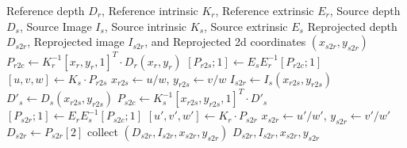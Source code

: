 \begin{algorithm}[!t]
    \caption{Multi-View Reprojection with Depth}
    \label{alg:reproj}
    \begin{algorithmic}[1] %
        \Require Reference depth $D_{r}$, Reference intrinsic $K_{r}$, Reference extrinsic $E_{r}$, Source depth $D_{s}$, Source Image $I_{s}$, Source intrinsic $K_{s}$, Source extrinsic $E_{s}$
        \Ensure Reprojected depth $D_{s2r}$, Reprojected image $I_{s2r}$, and Reprojected 2d coordinates $(x_{s2r}, y_{s2r})$
            \State $P_{r2c} \gets K_{r}^{-1} [x_r, y_r, 1]^T \cdot D_{r}(x_r, y_r)$
            \State $[P_{r2s};1] \gets E_{s} E_{r}^{-1} [P_{r2c};1]$
            \State $[u, v, w] \gets K_{s} \cdot P_{r2s}$
            \State $x_{r2s} \gets u/w$, $y_{r2s} \gets v/w$
            \State $I_{s2r} \gets I_{s}(x_{r2s}, y_{r2s})$
            \State $D'_{s} \gets D_{s}(x_{r2s}, y_{r2s})$
            \State $P_{s2c} \gets K_{s}^{-1} [x_{r2s}, y_{r2s}, 1]^T \cdot D'_{s}$
            \State $[P_{s2r}; 1] \gets E_{r} E_{s}^{-1} [P_{s2c}; 1]$
            \State $[u', v', w'] \gets K_{r} \cdot P_{s2r}$
            \State $x_{s2r} \gets u'/w'$, $y_{s2r} \gets v'/w'$
            \State $D_{s2r} \gets P_{s2r}[2]$
            \State collect $(D_{s2r}, I_{s2r}, x_{s2r}, y_{s2r})$
        \EndFor
        \State \Return $D_{s2r}, I_{s2r}, x_{s2r}, y_{s2r}$
    \end{algorithmic}
    \label{alg:1}
\end{algorithm}


